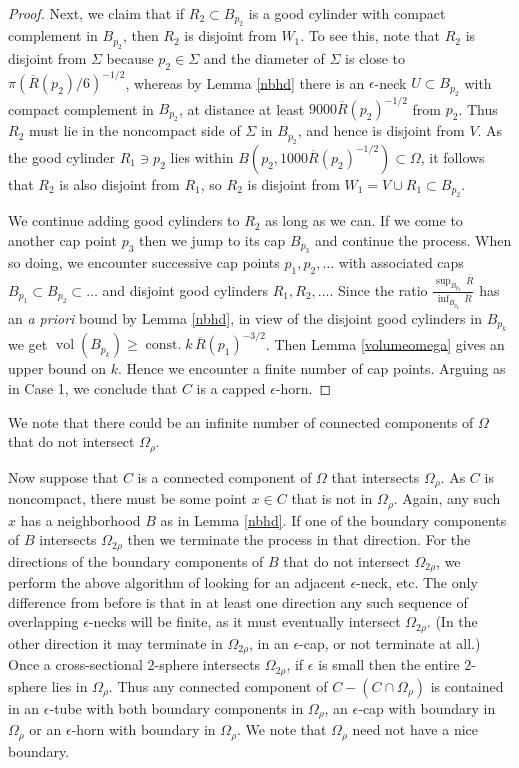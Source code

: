 \documentclass[12pt]{amsart}
\newcommand{\const}{\operatorname{const.}}
\newcommand{\vol}{\operatorname{vol}}
\newcommand{\eps}{\epsilon}
\newcommand{\ol}{\overline}
\newcommand{\Si}{\Sigma}
\numberwithin{equation}{section}
\theoremstyle{plain}
\theoremstyle{definition}
\theoremstyle{remark}
\begin{document}
\begin{proof}
Next, we claim that if $R_2\subset B_{p_2}$ is a good cylinder 
with compact complement in $B_{p_2}$, then $R_2$ is disjoint from $W_1$.  
To see this,  note that  $R_2$ is disjoint from $\Si$ because 
$p_2 \in \Si$ and the diameter
of $\Si$ is close to $\pi (\ol{R}(p_2)/6)^{-1/2}$, whereas by Lemma \ref{nbhd}
there is an $\eps$-neck $U\subset B_{p_2}$ with compact complement in 
$B_{p_2}$, at distance at least $9000 \ol{R}(p_2)^{-1/2}$ from $p_2$.
Thus $R_2$ must lie in the noncompact side of $\Si$ in $B_{p_2}$, and 
hence is disjoint from $V$. 
As the good cylinder
$R_1 \ni p_2$ lies within $B(p_2, 1000 \ol{R}(p_2)^{-1/2}) \subset \Omega$,
it follows that $R_2$ is also disjoint from $R_1$,
so $R_2$ is disjoint from $W_1=V\cup R_1\subset B_{p_2}$.

We continue adding good cylinders to $R_2$ as long as we can.
If we come
to another cap point $p_3$ then we jump to its cap
$B_{p_3}$ and continue the process.  
When so doing, we encounter 
successive cap points $p_1, p_2, \ldots$ with associated caps
$B_{p_1}\subset B_{p_2} \subset \ldots$ and disjoint good cylinders
$R_1, R_2, \ldots$.
Since the ratio 
$\frac{\sup_{B_{p_k}}\,\ol{R}}{\inf_{B_{p_k}}\,\ol{R}}$ has an 
{\it a priori}
bound by Lemma \ref{nbhd}, 
in view of the disjoint good cylinders in $B_{p_k}$
we get $\vol(B_{p_k})\geq \const  k\,\ol{R}(p_1)^{-3/2}$.
Then Lemma \ref{volumeomega} gives 
an upper bound on $k$.  Hence we encounter a finite
number of cap points. 
Arguing as in Case 1,
we conclude that $C$ is a capped $\eps$-horn.
\end{proof}


We note that there could be an infinite number of connected components of
$\Omega$ that do not intersect $\Omega_\rho$. 

Now suppose that $C$ is a connected component of $\Omega$ that intersects
$\Omega_\rho$. As $C$ is noncompact, there must be some point $x \in C$ that is
not in $\Omega_\rho$. Again, any such $x$ has a neighborhood $B$ as in Lemma
\ref{nbhd}. 
If one of the boundary components of $B$ intersects
$\Omega_{2\rho}$ then we terminate the process in that direction.
For the directions of the boundary components of $B$ that do not 
intersect $\Omega_{2\rho}$,
we perform the above algorithm of looking for an adjacent
$\epsilon$-neck, etc.
The only difference from before 
is that in at
least one direction any such
sequence of overlapping $\epsilon$-necks will be finite, as it must
eventually intersect 
$\Omega_{2\rho}$. 
(In the other direction it may terminate 
in $\Omega_{2\rho}$, in an $\epsilon$-cap, or not terminate at all.)
Once a cross-sectional $2$-sphere intersects $\Omega_{2\rho}$, if
$\epsilon$ is small then the entire $2$-sphere lies in $\Omega_\rho$.
Thus any connected component of $C - (C \cap \Omega_\rho)$
is contained in an $\epsilon$-tube with both boundary components in $\Omega_\rho$, 
an $\epsilon$-cap with boundary in $\Omega_\rho$ or an $\epsilon$-horn with boundary in 
$\Omega_\rho$. We note that $\Omega_\rho$ need not have a nice boundary.
\end{document}
